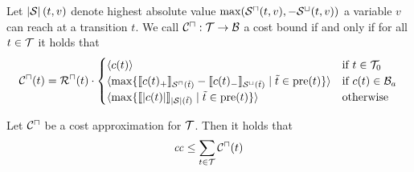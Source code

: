 \begin{definition}
  Let $\left|\mathcal{S}\right|(t, v)$ denote highest absolute value $\max({\mathcal{S}^\sqcap}(t, v), -{\mathcal{S}^\sqcup}(t, v))$ a variable $v$ can reach at a transition $t$.
  We call ${\mathcal{C}^\sqcap}: \mathcal{T} \rightarrow \mathcal{B}$ a cost bound if and only if for all $t \in \mathcal{T}$ it holds that
  \[ {\mathcal{C}^\sqcap}(t) = {\mathcal{R}^\sqcap}(t) \cdot
  \begin{cases}
    \langle c(t)\rangle & \text{if } t \in \mathcal{T}_0 \\
    \langle\max \lbrace \llbracket c(t)_+ \rrbracket_{{\mathcal{S}^\sqcap}(\tilde{t})} - \llbracket c(t)_- \rrbracket_{{\mathcal{S}^\sqcup}(\tilde{t})} \mid \tilde{t} \in \text{pre}(t) \rbrace\rangle & \text{if } c(t) \in \mathcal{B}_a \\
    \langle\max \lbrace \llbracket \left|c(t)\right| \rrbracket_{\left|\mathcal{S}\right|(\tilde{t})} \mid \tilde{t} \in \text{pre}(t) \rbrace\rangle & \text{otherwise} \\
  \end{cases}
  \]
\end{definition}

\begin{theorem}
	Let ${\mathcal{C}^\sqcap}$ be a cost approximation for $\mathcal{T}$.
	Then it holds that 
	\[ \mathit{cc} \leq \sum_{t \in \mathcal{T}} {\mathcal{C}^\sqcap}(t) \]
\end{theorem}
